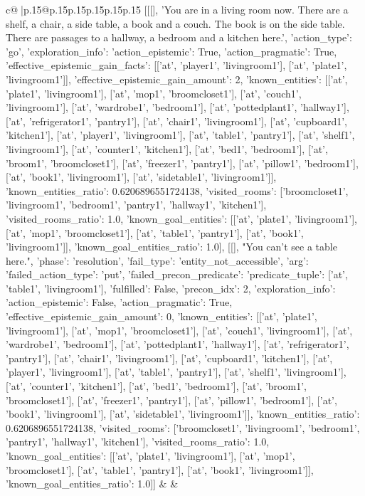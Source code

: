 \documentclass{article}
\begin{document}
{\begin{supertabular}{c@{$\;$}|p{.15\linewidth}@{}p{.15\linewidth}p{.15\linewidth}p{.15\linewidth}p{.15\linewidth}p{.15\linewidth}}
{{{	 [[[], 'You are in a living room now. There are a shelf, a chair, a side table, a book and a couch. The book is on the side table. There are passages to a hallway, a bedroom and a kitchen here.', {'action_type': 'go', 'exploration_info': {'action_epistemic': True, 'action_pragmatic': True, 'effective_epistemic_gain_facts': [['at', 'player1', 'livingroom1'], ['at', 'plate1', 'livingroom1']], 'effective_epistemic_gain_amount': 2, 'known_entities': [['at', 'plate1', 'livingroom1'], ['at', 'mop1', 'broomcloset1'], ['at', 'couch1', 'livingroom1'], ['at', 'wardrobe1', 'bedroom1'], ['at', 'pottedplant1', 'hallway1'], ['at', 'refrigerator1', 'pantry1'], ['at', 'chair1', 'livingroom1'], ['at', 'cupboard1', 'kitchen1'], ['at', 'player1', 'livingroom1'], ['at', 'table1', 'pantry1'], ['at', 'shelf1', 'livingroom1'], ['at', 'counter1', 'kitchen1'], ['at', 'bed1', 'bedroom1'], ['at', 'broom1', 'broomcloset1'], ['at', 'freezer1', 'pantry1'], ['at', 'pillow1', 'bedroom1'], ['at', 'book1', 'livingroom1'], ['at', 'sidetable1', 'livingroom1']], 'known_entities_ratio': 0.6206896551724138, 'visited_rooms': ['broomcloset1', 'livingroom1', 'bedroom1', 'pantry1', 'hallway1', 'kitchen1'], 'visited_rooms_ratio': 1.0, 'known_goal_entities': [['at', 'plate1', 'livingroom1'], ['at', 'mop1', 'broomcloset1'], ['at', 'table1', 'pantry1'], ['at', 'book1', 'livingroom1']], 'known_goal_entities_ratio': 1.0}}], [[], "You can't see a table here.", {'phase': 'resolution', 'fail_type': 'entity_not_accessible', 'arg': {'failed_action_type': 'put', 'failed_precon_predicate': {'predicate_tuple': ['at', 'table1', 'livingroom1'], 'fulfilled': False, 'precon_idx': 2}}, 'exploration_info': {'action_epistemic': False, 'action_pragmatic': True, 'effective_epistemic_gain_amount': 0, 'known_entities': [['at', 'plate1', 'livingroom1'], ['at', 'mop1', 'broomcloset1'], ['at', 'couch1', 'livingroom1'], ['at', 'wardrobe1', 'bedroom1'], ['at', 'pottedplant1', 'hallway1'], ['at', 'refrigerator1', 'pantry1'], ['at', 'chair1', 'livingroom1'], ['at', 'cupboard1', 'kitchen1'], ['at', 'player1', 'livingroom1'], ['at', 'table1', 'pantry1'], ['at', 'shelf1', 'livingroom1'], ['at', 'counter1', 'kitchen1'], ['at', 'bed1', 'bedroom1'], ['at', 'broom1', 'broomcloset1'], ['at', 'freezer1', 'pantry1'], ['at', 'pillow1', 'bedroom1'], ['at', 'book1', 'livingroom1'], ['at', 'sidetable1', 'livingroom1']], 'known_entities_ratio': 0.6206896551724138, 'visited_rooms': ['broomcloset1', 'livingroom1', 'bedroom1', 'pantry1', 'hallway1', 'kitchen1'], 'visited_rooms_ratio': 1.0, 'known_goal_entities': [['at', 'plate1', 'livingroom1'], ['at', 'mop1', 'broomcloset1'], ['at', 'table1', 'pantry1'], ['at', 'book1', 'livingroom1']], 'known_goal_entities_ratio': 1.0}}]] 
	  } 
	   } 
	   } 
	 & & \\ 
 


\end{supertabular}}
\end{document}
